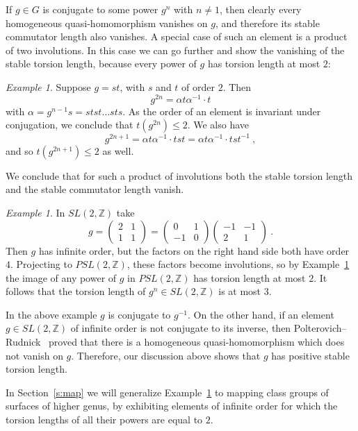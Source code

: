 \documentclass[12pt]{amsart}
\theoremstyle{remark}
\newtheorem{ex}[thm]{Example}
\theoremstyle{definition}
\newcommand{\Z}{\mathbb{ Z}}
\begin{document}
    If $g\in G$ is conjugate to some power $g^{n}$ with $n\neq 1$, then 
clearly every homogeneous quasi-homomorphism vanishes on $g$, and 
therefore its stable commutator length also vanishes. A special case 
of such an element is a product of two involutions. 
In this case we can go further and show the vanishing of the stable 
torsion length, because every power of $g$ has torsion length at 
most $2$:
\begin{ex}\label{ex:involutions}
    Suppose $g=st$, with $s$ and $t$ of order $2$. Then 
    $$
    g^{2n}=\alpha t \alpha^{-1} \cdot t
    $$
    with $\alpha = g^{n-1}s = stst\ldots sts$. As the order of an 
    element is invariant under conjugation, we 
    conclude that $t(g^{2n})\leq 2$. We also have 
    $$
    g^{2n+1}=\alpha t \alpha^{-1} \cdot tst = \alpha t \alpha^{-1} \cdot 
    tst^{-1} \ ,
    $$
    and so $t(g^{2n+1})\leq 2$ as well.
    
    We conclude that for such a product of involutions both the 
    stable torsion length and the stable commutator length vanish.
    \end{ex}
    
    \begin{ex}\label{ex:SL}
	In $SL(2,\Z)$ take 
	$$
	g=\begin{pmatrix} 2 & 1 \\ 1 & 1 \end{pmatrix} = 
	\begin{pmatrix} 0 & 1 \\ -1 & 0 \end{pmatrix} 
	    \begin{pmatrix} -1 & -1 \\ 2 & 1 \end{pmatrix} \ .
	$$ 
	Then $g$ has infinite order, but the factors on the right hand side 
	both have order $4$. Projecting to $PSL(2,\Z)$, these factors become 
	involutions, so by Example~\ref{ex:involutions} the image of any 
	power of $g$ in $PSL(2,\Z)$ has torsion length at most $2$. It 
	follows that the torsion length of $g^{n}\in SL(2,\Z)$ is at most $3$.
	\end{ex}
	In the above example $g$ is conjugate to $g^{-1}$. On the other hand,
	if an element $g\in SL(2,\Z)$ of infinite order is not conjugate to 
	its inverse, then Polterovich--Rudnick~\cite{PR} proved that there 
	is a homogeneous quasi-homomorphism which does not vanish on $g$. 
	Therefore, our discussion above shows that $g$ has positive stable 
	torsion length.
	
    In Section~\ref{s:map} we will generalize Example~\ref{ex:SL} to mapping
    class groups of surfaces of higher genus, by exhibiting elements of 
    infinite order for which the torsion lengths of all their powers are 
    equal to $2$. 
    
\end{document}
